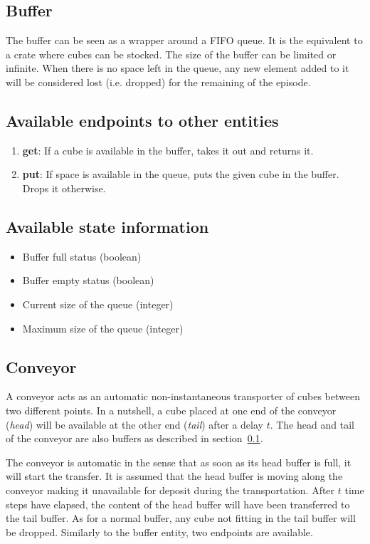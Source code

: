 \subsection{Buffer}
\label{sec:archi-uffer}
The buffer can be seen as a wrapper around a FIFO queue. It is the equivalent to a crate where cubes can be stocked. The size of the buffer can be limited or infinite. When there is no space left in the queue, any new element added to it will be considered lost (i.e. dropped) for the remaining of the episode.

\subsection*{Available endpoints to other entities}
\begin{enumerate}[label=(\arabic*)]
\item \textbf{get}: If a cube is available in the buffer, takes it out and returns it.
\item \textbf{put}: If space is available in the queue, puts the given cube in the buffer. Drops it otherwise.
\end{enumerate} 

\subsection*{Available state information}
\begin{itemize}[noitemsep]
\item Buffer full status (boolean)
\item Buffer empty status (boolean)
\item Current size of the queue (integer)
\item Maximum size of the queue (integer)
\end{itemize}

\subsection{Conveyor}

A conveyor acts as an automatic non-instantaneous transporter of cubes between two different points. In a nutshell, a cube placed at one end of the conveyor (\textit{head}) will be available at the other end (\textit{tail}) after a delay $t$. The head and tail of the conveyor are also buffers as described in section~\ref{sec:archi-uffer}.

The conveyor is automatic in the sense that as soon as its head buffer is full, it will start the transfer. It is assumed that the head buffer is moving along the conveyor making it unavailable for deposit during the transportation. After $t$ time steps have elapsed, the content of the head buffer will have been transferred to the tail buffer. As for a normal buffer, any cube not fitting in the tail buffer will be dropped. Similarly to the buffer entity, two endpoints are available.

